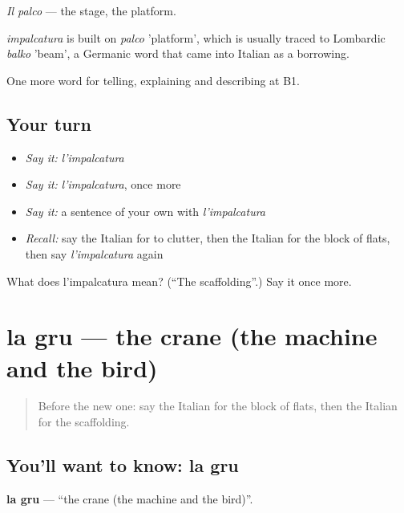 \emph{Il palco} — the stage, the platform.

\begin{cousinweb}
\emph{impalcatura} is built on \emph{palco} 'platform', which is usually traced to Lombardic \emph{balko} 'beam', a Germanic word that came into Italian as a borrowing.
\end{cousinweb}

\begin{grammarlens}[title={What you've built}]
One more word for telling, explaining and describing at B1.
\end{grammarlens}

\subsection*{Your turn}
\begin{itemize}
\raggedright
  \item \emph{Say it:} \emph{l'impalcatura}
  \item \emph{Say it:} \emph{l'impalcatura}, once more
  \item \emph{Say it:} a sentence of your own with \emph{l'impalcatura}
  \item \emph{Recall:} say the Italian for to clutter, then the Italian for the block of flats, then say \emph{l'impalcatura} again
\end{itemize}

\begin{tcolorbox}[breakable,colback=teal!4,colframe=teal!35!black,title={Before you move on}]
What does l'impalcatura mean? (\textquotedblleft{}The scaffolding\textquotedblright{}.) Say it once more.
\end{tcolorbox}
\section[la gru]{la gru — the crane (the machine and the bird)}

\label{lesson:IT-C449-gru}



\begin{quote}
Before the new one: say the Italian for the block of flats, then the Italian for the scaffolding.
\end{quote}

\subsection*{You'll want to know: la gru}
\textbf{la gru} — \textquotedblleft{}the crane (the machine and the bird)\textquotedblright{}.

